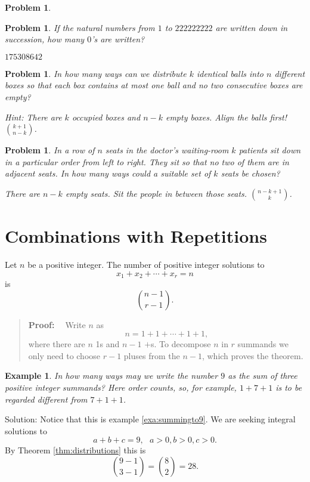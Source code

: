 \documentclass[11pt, openany]{book}
\theoremstyle{change} \theoremheaderfont{\blue\sffamily\bfseries}
\newtheorem{exa}[thm]{Example}
\newtheorem{pro}[thm]{Problem}
\newcommand{\proofsymbol}{\Pisymbol{pzd}{113}}
\theoremstyle{nonumberplain} \theoremheaderfont{\sffamily\bfseries}
\newenvironment{pf}[0]{\itshape\begin{quote}{\bf Proof: \ }}{\proofsymbol\end{quote}}
\def\binom#1#2{{#1\choose#2}}
\newcommand{\í}{\'{\i}}
\begin{document}
\begin{multicols}{2}
\begin{pro}
\begin{answer}
\end{answer}
      \end{pro}
            \begin{pro} If the natural numbers from $1$ to $222222222$ are written
down in succession, how many $0$'s are written?\begin{answer}
$175308642$

\end{answer}
    \end{pro}
           \begin{pro} In how many ways can we distribute $k$ identical balls into $n$
different boxes so that each box contains at most one ball and no
two consecutive boxes are empty? \begin{answer}Hint: There are $k$
occupied boxes and $n - k$ empty boxes. Align the balls first!
$\binom{k + 1}{n - k}$.
\end{answer}
      \end{pro}
              \begin{pro} In a row of $n$ seats in the doctor's waiting-room $k$ patients
sit down in a particular order from left to right. They sit so that
no two of them are in adjacent seats.
In how many ways could a suitable set of $k$ seats be chosen? \\
\begin{answer} There are $n - k$ empty seats. Sit the people in between
those seats. $\binom{n  - k + 1}{k}$. \end{answer}
\end{pro}
\end{multicols}

\section{Combinations with Repetitions}
\begin{thm}[De Moivre]
Let $n$ be a positive integer. The number of positive integer
solutions to
$$x_1 + x_2 + \cdots + x_r = n$$is
$$\binom{n - 1}{r - 1}.$$
\label{thm:distributions}\end{thm}
\begin{pf}
Write $n$ as
$$n = 1 + 1 + \cdots + 1 + 1,$$where there are $n$ 1s and $n - 1$
$+$s. To decompose $n$ in $r$ summands we only need to choose $r -
1$ pluses from the $n - 1$, which proves the theorem.
\end{pf}
\begin{exa}
In how many ways may we write the number $9$ as the sum of three
positive integer summands? Here order counts, so, for example, $1 +
7 + 1$ is to be regarded different from $7 + 1 + 1$.
\end{exa}
Solution: Notice that this is example \ref{exa:summingto9}. We are
seeking integral solutions to $$ a + b + c = 9,  \ \ \ a>0, b>0,
c>0.
$$ By Theorem \ref{thm:distributions} this is $$\binom{9-1}{3-1} = \binom{8}{2} =  28.   $$
\end{document}
